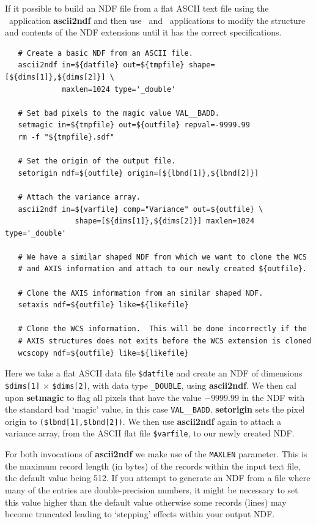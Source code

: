 \documentclass[twoside,11pt]{article}
\newcommand{\xref}[3]{#1}
\begin{document}
{If it possible to build an \xref{NDF}{sun33}{} file from a flat ASCII
text file using the \CONVERT\ application
\xref{{\bf ascii2ndf}}{sun55}{ASCII2NDF} and then use \KAPPAref\ and
\DATACUBEref\ applications to modify the structure and contents of the
NDF extensions until it has the correct specifications.

\small\begin{verbatim}
   # Create a basic NDF from an ASCII file.
   ascii2ndf in=${datfile} out=${tmpfile} shape=[${dims[1]},${dims[2]}] \
             maxlen=1024 type='_double'

   # Set bad pixels to the magic value VAL__BADD.
   setmagic in=${tmpfile} out=${outfile} repval=-9999.99 
   rm -f "${tmpfile}.sdf"

   # Set the origin of the output file.
   setorigin ndf=${outfile} origin=[${lbnd[1]},${lbnd[2]}] 

   # Attach the variance array.
   ascii2ndf in=${varfile} comp="Variance" out=${outfile} \
                shape=[${dims[1]},${dims[2]}] maxlen=1024 type='_double' 

   # We have a similar shaped NDF from which we want to clone the WCS
   # and AXIS information and attach to our newly created ${outfile}.
   
   # Clone the AXIS information from an similar shaped NDF.
   setaxis ndf=${outfile} like=${likefile}
   
   # Clone the WCS information.  This will be done incorrectly if the
   # AXIS structures does not exits before the WCS extension is cloned
   wcscopy ndf=${outfile} like=${likefile}
\end{verbatim}\normalsize

Here we take a flat ASCII data file \verb+$datfile+ and create an NDF
of dimensions \verb+$dims[1]+ $\times$ \verb+$dims[2]+, with data type
{\tt \_DOUBLE}, using {\bf ascii2ndf}.  We then cal upon
\xref{{\bf setmagic}}{sun95}{SETMAGIC} to flag all pixels that have the
value $-9999.99$ in the NDF with the \xref{standard bad `magic'
value}{sun95}{se_masking}, in this case {\tt VAL\_\_BADD}.  
\xref{{\bf setorigin}}{sun95}{SETORIGIN} sets the pixel origin 
to \verb+($lbnd[1],$lbnd[2])+.  We then use {\bf ascii2ndf} again to
attach a variance array, from the ASCII flat file \verb+$varfile+, to
our newly created NDF.

For both invocations of {\bf ascii2ndf} we make use of the {\tt MAXLEN}
parameter.  This is the maximum record length (in bytes) of the records
within the input text file, the default value being 512.  If you
attempt to generate an NDF from a file where many of the entries are
double-precision numbers, it might be necessary to set this value
higher than the default value otherwise some records (lines) may
become truncated leading to `stepping' effects within your output
NDF.

}
\end{document}
